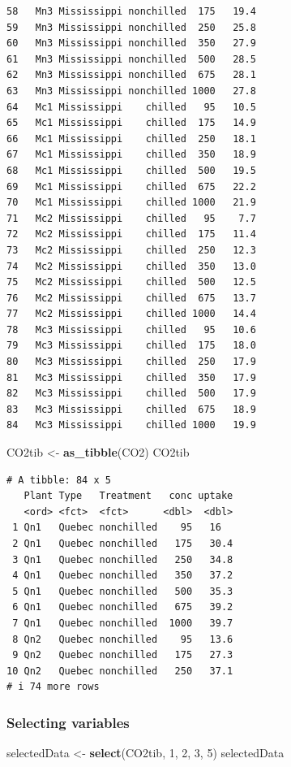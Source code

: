 \documentclass[
]{article}
\newenvironment{Shaded}{\begin{snugshade}}{\end{snugshade}}
\newcommand{\DecValTok}[1]{\textcolor[rgb]{0.00,0.00,0.81}{#1}}
\newcommand{\FunctionTok}[1]{\textcolor[rgb]{0.13,0.29,0.53}{\textbf{#1}}}
\newcommand{\NormalTok}[1]{#1}
\newcommand{\OtherTok}[1]{\textcolor[rgb]{0.56,0.35,0.01}{#1}}
\begin{document}
\begin{verbatim}
58   Mn3 Mississippi nonchilled  175   19.4
59   Mn3 Mississippi nonchilled  250   25.8
60   Mn3 Mississippi nonchilled  350   27.9
61   Mn3 Mississippi nonchilled  500   28.5
62   Mn3 Mississippi nonchilled  675   28.1
63   Mn3 Mississippi nonchilled 1000   27.8
64   Mc1 Mississippi    chilled   95   10.5
65   Mc1 Mississippi    chilled  175   14.9
66   Mc1 Mississippi    chilled  250   18.1
67   Mc1 Mississippi    chilled  350   18.9
68   Mc1 Mississippi    chilled  500   19.5
69   Mc1 Mississippi    chilled  675   22.2
70   Mc1 Mississippi    chilled 1000   21.9
71   Mc2 Mississippi    chilled   95    7.7
72   Mc2 Mississippi    chilled  175   11.4
73   Mc2 Mississippi    chilled  250   12.3
74   Mc2 Mississippi    chilled  350   13.0
75   Mc2 Mississippi    chilled  500   12.5
76   Mc2 Mississippi    chilled  675   13.7
77   Mc2 Mississippi    chilled 1000   14.4
78   Mc3 Mississippi    chilled   95   10.6
79   Mc3 Mississippi    chilled  175   18.0
80   Mc3 Mississippi    chilled  250   17.9
81   Mc3 Mississippi    chilled  350   17.9
82   Mc3 Mississippi    chilled  500   17.9
83   Mc3 Mississippi    chilled  675   18.9
84   Mc3 Mississippi    chilled 1000   19.9
\end{verbatim}

\begin{Shaded}
\begin{Highlighting}[]
\NormalTok{CO2tib }\OtherTok{\textless{}{-}} \FunctionTok{as\_tibble}\NormalTok{(CO2)}
\NormalTok{CO2tib}
\end{Highlighting}
\end{Shaded}

\begin{verbatim}
# A tibble: 84 x 5
   Plant Type   Treatment   conc uptake
   <ord> <fct>  <fct>      <dbl>  <dbl>
 1 Qn1   Quebec nonchilled    95   16  
 2 Qn1   Quebec nonchilled   175   30.4
 3 Qn1   Quebec nonchilled   250   34.8
 4 Qn1   Quebec nonchilled   350   37.2
 5 Qn1   Quebec nonchilled   500   35.3
 6 Qn1   Quebec nonchilled   675   39.2
 7 Qn1   Quebec nonchilled  1000   39.7
 8 Qn2   Quebec nonchilled    95   13.6
 9 Qn2   Quebec nonchilled   175   27.3
10 Qn2   Quebec nonchilled   250   37.1
# i 74 more rows
\end{verbatim}

\subsubsection{Selecting variables}\label{selecting-variables}

\begin{Shaded}
\begin{Highlighting}[]
\NormalTok{selectedData }\OtherTok{\textless{}{-}} \FunctionTok{select}\NormalTok{(CO2tib, }\DecValTok{1}\NormalTok{, }\DecValTok{2}\NormalTok{, }\DecValTok{3}\NormalTok{, }\DecValTok{5}\NormalTok{)}
\NormalTok{selectedData}
\end{Highlighting}
\end{Shaded}
\end{document}
